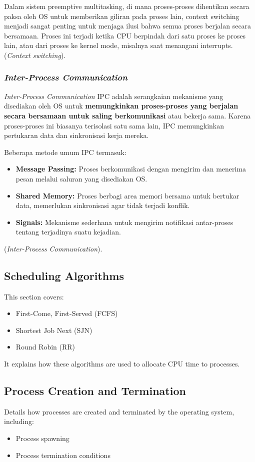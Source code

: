 \documentclass[12pt]{article}
\begin{document}
 Dalam sistem preemptive multitasking, di mana proses-proses dihentikan secara paksa oleh OS untuk memberikan giliran pada proses lain, context switching menjadi sangat penting untuk menjaga ilusi bahwa semua proses berjalan secara bersamaan. Proses ini terjadi ketika CPU berpindah dari satu proses ke proses lain, atau dari proses ke kernel mode, misalnya saat menangani interrupts. 
 (\textit{Context switching}).

 \subsubsection{\textit{Inter-Process Communication}}
 \textit{Inter-Process Communication} IPC adalah serangkaian mekanisme yang disediakan oleh OS untuk \textbf{memungkinkan proses-proses yang berjalan secara bersamaan untuk saling berkomunikasi }atau bekerja sama. Karena proses-proses ini biasanya terisolasi satu sama lain, IPC memungkinkan pertukaran data dan sinkronisasi kerja mereka. 

Beberapa metode umum IPC termasuk:
\begin{itemize}
    \item \textbf{Message Passing: }Proses berkomunikasi dengan mengirim dan menerima pesan melalui saluran yang disediakan OS. 
    \item \textbf{Shared Memory:} Proses berbagi area memori bersama untuk bertukar data, memerlukan sinkronisasi agar tidak terjadi konflik. 
    \item \textbf{Signals:} Mekanisme sederhana untuk mengirim notifikasi antar-proses tentang terjadinya suatu kejadian. 
\end{itemize}
 (\textit{Inter-Process Communication}).

\subsection{Scheduling Algorithms}
This section covers:
\begin{itemize}
    \item First-Come, First-Served (FCFS)
    \item Shortest Job Next (SJN)
    \item Round Robin (RR)
\end{itemize}
It explains how these algorithms are used to allocate CPU time to processes.

\subsection{Process Creation and Termination}
Details how processes are created and terminated by the operating system, including:
\begin{itemize}
    \item Process spawning
    \item Process termination conditions
\end{itemize}
\end{document}
